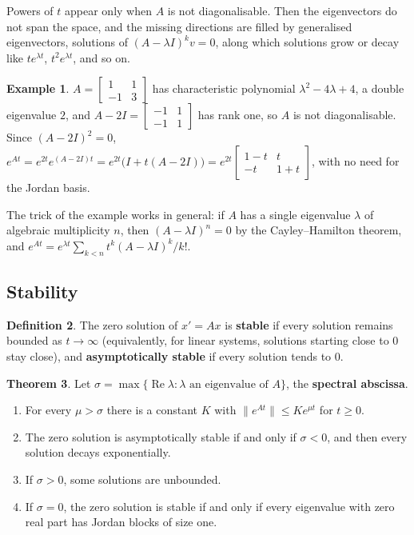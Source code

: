 \documentclass[11pt,a4paper]{article}
\numberwithin{equation}{section}
\DeclareMathOperator{\Real}{Re}
\theoremstyle{definition}
\newtheorem{thm}{Theorem}[subsection]
\newtheorem{defn}[thm]{Definition}
\newtheorem{exa}[thm]{Example}
\begin{document}
Powers of $t$ appear only when $A$ is not diagonalisable. Then the eigenvectors do not span the space, and the missing directions are filled by generalised eigenvectors,
solutions of $(A - \lambda I)^kv = 0$, along which solutions grow or decay like $te^{\lambda t}$, $t^2e^{\lambda t}$, and so on.

\begin{exa}
\label{ex:defective}
$A = \begin{bmatrix} 1 & 1\\ -1 & 3\end{bmatrix}$ has characteristic polynomial $\lambda^2 - 4\lambda + 4$, a double eigenvalue $2$, and $A - 2I = \begin{bmatrix} -1 & 1\\ -1 & 1\end{bmatrix}$ has rank one, so $A$ is not
diagonalisable. Since $(A - 2I)^2 = 0$, $e^{At} = e^{2t}e^{(A - 2I)t} = e^{2t}\bigl(I + t(A - 2I)\bigr) = e^{2t}\begin{bmatrix} 1 - t & t\\ -t & 1 + t\end{bmatrix}$, with no need for the Jordan basis.
\end{exa}

The trick of the example works in general: if $A$ has a single eigenvalue $\lambda$ of algebraic multiplicity $n$, then $(A - \lambda I)^n = 0$ by the Cayley--Hamilton theorem, and
$e^{At} = e^{\lambda t}\sum_{k<n}t^k(A - \lambda I)^k/k!$.

\subsection{Stability}
\label{ssec:linstab}

\begin{defn}
The zero solution of $x' = Ax$ is \textbf{stable} if every solution remains bounded as $t \to \infty$ (equivalently, for linear systems, solutions starting close to $0$ stay close), and
\textbf{asymptotically stable} if every solution tends to $0$.
\end{defn}

\begin{thm}
\label{thm:linstab}
Let $\sigma = \max\{\Real\lambda : \lambda \text{ an eigenvalue of } A\}$, the \textbf{spectral abscissa}.
\begin{enumerate}[label=(\roman*)]
\item For every $\mu > \sigma$ there is a constant $K$ with $\|e^{At}\| \leq Ke^{\mu t}$ for $t \geq 0$.
\item The zero solution is asymptotically stable if and only if $\sigma < 0$, and then every solution decays exponentially.
\item If $\sigma > 0$, some solutions are unbounded.
\item If $\sigma = 0$, the zero solution is stable if and only if every eigenvalue with zero real part has Jordan blocks of size one.
\end{enumerate}
\end{thm}
\end{document}
